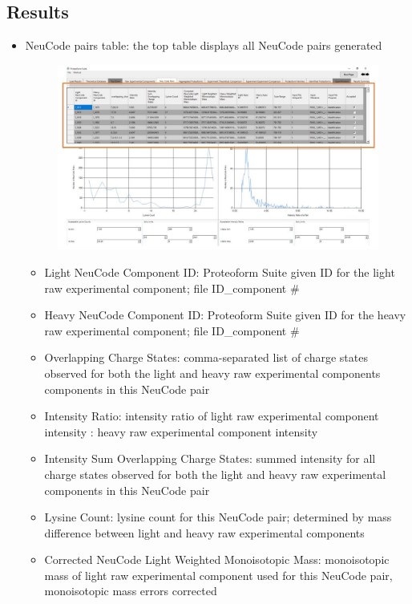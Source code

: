 \subsection{Results}
\begin{itemize}
	\item NeuCode pairs table: the top table displays all NeuCode pairs generated
	\begin{figure}[h]
\centering
\includegraphics[scale=0.5]{figures/neucode2.jpg}
\end{figure}
\begin{itemize}
		\item Light NeuCode Component ID: Proteoform Suite given ID for the light raw experimental component; file ID\_component \#
		\item Heavy NeuCode Component ID: Proteoform Suite given ID for the heavy raw experimental component; file ID\_component \#
		\item Overlapping Charge States: comma-separated list of charge states observed for both the light and heavy raw experimental components components in this NeuCode pair
		\item Intensity Ratio: intensity ratio of light raw experimental component intensity : heavy raw experimental component intensity
		\item Intensity Sum Overlapping Charge States: summed intensity for all charge states observed for both the light and heavy raw experimental components in this NeuCode pair
		\item Lysine Count: lysine count for this NeuCode pair; determined by mass difference between light and heavy raw experimental components
		\item Corrected NeuCode Light Weighted Monoisotopic Mass: monoisotopic mass of light raw experimental component used for this NeuCode pair, monoisotopic mass errors corrected

\end{itemize}
\end{itemize}
